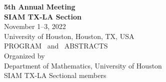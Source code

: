 \thispagestyle{empty}
\vspace*{4ex}

{\center
{\LARGE \bf 5th Annual Meeting}\\  [8mm]
{\Huge \bf SIAM TX-LA Section} \\ [8mm]

{\Large November 1--3, 2022} \\[3mm]
{\Large University of Houston, Houston, TX, USA} \\[36mm]

{\LARGE PROGRAM \ and \ ABSTRACTS}  \\ [32mm]


{\large Organized by} \\ [3mm]
{\Large Department of  Mathematics, University of Houston\\
\vspace{5pt} SIAM TX-LA Sectional members} \\ [16mm]


}
